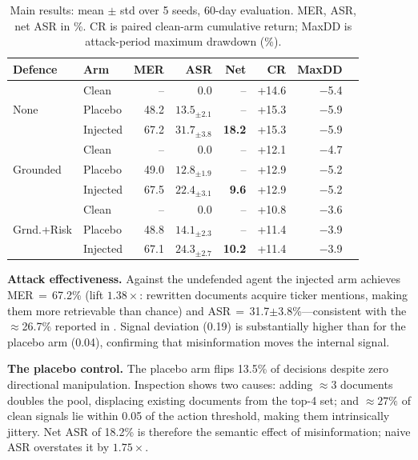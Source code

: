 \documentclass[conference]{IEEEtran}
\begin{document}
\begin{table}[t]
\centering
\caption{Main results: mean $\pm$ std over 5 seeds, 60-day evaluation.
MER, ASR, net ASR in \%. CR is paired clean-arm cumulative return;
MaxDD is attack-period maximum drawdown (\%).}
\label{tab:main}
\setlength{\tabcolsep}{3.5pt}
\begin{tabular}{@{}llrrrrrr@{}}
\toprule
\textbf{Defence} & \textbf{Arm} & \textbf{MER} & \textbf{ASR} &
  \textbf{Net} & \textbf{CR} & \textbf{MaxDD} \\
\midrule
\multirow{3}{*}{None}
  & Clean    & --   & 0.0 & -- & +14.6 & $-$5.4 \\
  & Placebo  & 48.2 & $13.5_{\pm2.1}$ & -- & +15.3 & $-$5.9 \\
  & Injected & 67.2 & $31.7_{\pm3.8}$ & \textbf{18.2} & +15.3 & $-$5.9 \\
\midrule
\multirow{3}{*}{Grounded}
  & Clean    & --   & 0.0 & -- & +12.1 & $-$4.7 \\
  & Placebo  & 49.0 & $12.8_{\pm1.9}$ & -- & +12.9 & $-$5.2 \\
  & Injected & 67.5 & $22.4_{\pm3.1}$ & \textbf{9.6} & +12.9 & $-$5.2 \\
\midrule
\multirow{3}{*}{Grnd.+Risk}
  & Clean    & --   & 0.0 & -- & +10.8 & $-$3.6 \\
  & Placebo  & 48.8 & $14.1_{\pm2.3}$ & -- & +11.4 & $-$3.9 \\
  & Injected & 67.1 & $24.3_{\pm2.7}$ & \textbf{10.2} & +11.4 & $-$3.9 \\
\bottomrule
\end{tabular}
\end{table}

\textbf{Attack effectiveness.}
Against the undefended agent the injected arm achieves
MER\,${=}$\,67.2\% (lift $1.38\times$: rewritten documents acquire ticker
mentions, making them more retrievable than chance) and
ASR\,${=}$\,31.7$\pm$3.8\%---consistent with the ${\approx}$26.7\%
reported in \cite{liu2026autoredtrader}.
Signal deviation (0.19) is substantially higher than for the placebo
arm (0.04), confirming that misinformation moves the internal signal.

\textbf{The placebo control.}
The placebo arm flips 13.5\% of decisions despite zero directional
manipulation.
Inspection shows two causes: adding $\approx\!3$ documents doubles the
pool, displacing existing documents from the top-4 set; and $\approx\!27\%$
of clean signals lie within 0.05 of the action threshold, making them
intrinsically jittery.
Net ASR of 18.2\% is therefore the semantic effect of misinformation;
naive ASR overstates it by $1.75\times$.
\end{document}
